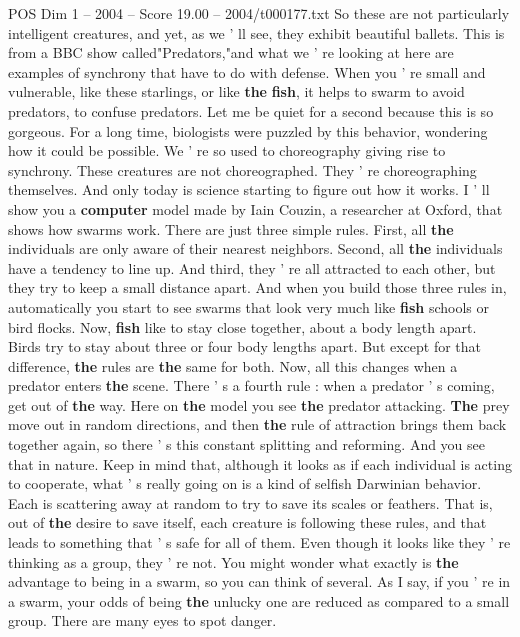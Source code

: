 \begin{textsample}{POS Dim 1 – 2004 – Score 19.00 – 2004/t000177.txt}
So these are not particularly intelligent creatures, and yet, as we ' ll see, they exhibit beautiful ballets.
This is from a BBC show called"Predators,"and what we ' re looking at here are examples of synchrony that have to do with defense.
When you ' re small and vulnerable, like these starlings, or like \textbf{the} \textbf{fish}, it helps to swarm to avoid predators, to confuse predators.
Let me be quiet for a second because this is so gorgeous.
For a long time, biologists were puzzled by this behavior, wondering how it could be possible.
We ' re so used to choreography giving rise to synchrony.
These creatures are not choreographed.
They ' re choreographing themselves.
And only today is science starting to figure out how it works.
I ' ll show you a \textbf{computer} model made by Iain Couzin, a researcher at Oxford, that shows how swarms work.
There are just three simple rules.
First, all \textbf{the} individuals are only aware of their nearest neighbors.
Second, all \textbf{the} individuals have a tendency to line up.
And third, they ' re all attracted to each other, but they try to keep a small distance apart.
And when you build those three rules in, automatically you start to see swarms that look very much like \textbf{fish} schools or bird flocks.
Now, \textbf{fish} like to stay close together, about a body length apart.
Birds try to stay about three or four body lengths apart.
But except for that difference, \textbf{the} rules are \textbf{the} same for both.
Now, all this changes when a predator enters \textbf{the} scene.
There ' s a fourth rule : when a predator ' s coming, get out of \textbf{the} way.
Here on \textbf{the} model you see \textbf{the} predator attacking. \textbf{The} prey move out in random directions, and then \textbf{the} rule of attraction brings them back together again, so there ' s this constant splitting and reforming.
And you see that in nature.
Keep in mind that, although it looks as if each individual is acting to cooperate, what ' s really going on is a kind of selfish Darwinian behavior.
Each is scattering away at random to try to save its scales or feathers.
That is, out of \textbf{the} desire to save itself, each creature is following these rules, and that leads to something that ' s safe for all of them.
Even though it looks like they ' re thinking as a group, they ' re not.
You might wonder what exactly is \textbf{the} advantage to being in a swarm, so you can think of several.
As I say, if you ' re in a swarm, your odds of being \textbf{the} unlucky one are reduced as compared to a small group.
There are many eyes to spot danger.

\end{textsample}
